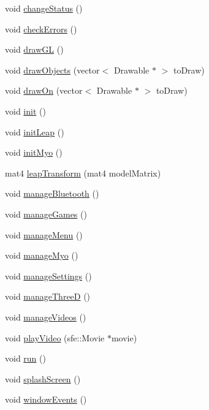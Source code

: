 \begin{DoxyCompactItemize}
\item 
void \hyperlink{classManager_a4c983bfe24e7bbda4126c674ec3b2bb7}{change\+Status} ()
\item 
void \hyperlink{classManager_abaf6f51c102571e1497bb616a10a34fe}{check\+Errors} ()
\item 
void \hyperlink{classManager_a4ddeea31257de952e0808827d777dbf6}{draw\+GL} ()
\item 
void \hyperlink{classManager_ac87bc79103e440a13485b005b09522c8}{draw\+Objects} (vector$<$ Drawable $\ast$ $>$ to\+Draw)
\item 
void \hyperlink{classManager_a5eea80bf7833673735c5287b3d3a41bf}{draw\+On} (vector$<$ Drawable $\ast$ $>$ to\+Draw)
\item 
void \hyperlink{classManager_a5e70b531d3af13c1a6af84dcc84fa225}{init} ()
\item 
void \hyperlink{classManager_aa30c66daa7d2e904f4b0cd2f2e6761a3}{init\+Leap} ()
\item 
void \hyperlink{classManager_a6a9eea3ca980647e117e1c9c7a682b0c}{init\+Myo} ()
\item 
mat4 \hyperlink{classManager_a280a961fb5889169708d838cde76e174}{leap\+Transform} (mat4 model\+Matrix)
\item 
void \hyperlink{classManager_a8abce1582047cb434a87dbe2dbe9c00d}{manage\+Bluetooth} ()
\item 
void \hyperlink{classManager_a366f9a671838a633672bc51f9d258646}{manage\+Games} ()
\item 
void \hyperlink{classManager_a98ffad2b354a12650d074e604edeffa6}{manage\+Menu} ()
\item 
void \hyperlink{classManager_af8645d966523587f7d7853e8a1497ed4}{manage\+Myo} ()
\item 
void \hyperlink{classManager_abaa47fce892b3e7cb91cce4f22f6dc2c}{manage\+Settings} ()
\item 
void \hyperlink{classManager_ad2a81bcf9fe948180aba898f2a177a39}{manage\+ThreeD} ()
\item 
void \hyperlink{classManager_a4c13c8264c0e9e02c9652d1350c69186}{manage\+Videos} ()
\item 
void \hyperlink{classManager_a30e2453a8522192bcf0061491fb0e768}{play\+Video} (sfe\+::\+Movie $\ast$movie)
\item 
void \hyperlink{classManager_af8c67c221068e4e3ccccf1d5f70ba8ee}{run} ()
\item 
void \hyperlink{classManager_ab9652f47f396c929f9b05b3619bd3254}{splash\+Screen} ()
\item 
void \hyperlink{classManager_a23be264535544bde00ce3b9216f5839e}{window\+Events} ()
\end{DoxyCompactItemize}
